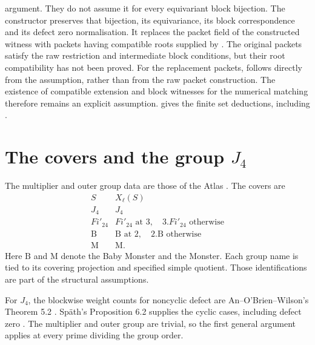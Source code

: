 \begin{implementation}
argument. They do not assume it for every equivariant block bijection.
The constructor  preserves
that bijection, its equivariance, its block correspondence and its
defect zero normalisation. It replaces the packet field of the constructed
witness with packets having compatible roots supplied by
. The original packets satisfy the raw
restriction and intermediate block conditions, but their root compatibility
has not been proved. For the replacement packets, 
follows directly from the assumption, rather than from the raw packet
construction. The existence of compatible extension and block witnesses
for the numerical matching therefore remains an explicit assumption.
 gives the finite set deductions, including .
\end{implementation}

\section{The covers and the group \texorpdfstring{$J_4$}{J4}}

The multiplier and outer group data are those of the Atlas
\cite[Table~1]{Atlas1985}. The covers are
\[
\begin{array}{c|c}
 S&X_\ell(S)\\\hline
 J_4&J_4\\
 Fi'_{24}&Fi'_{24}\text{ at }3,\quad3.Fi'_{24}\text{ otherwise}\\
 \mathrm B&\mathrm B\text{ at }2,\quad2.\mathrm B\text{ otherwise}\\
 \mathrm M&\mathrm M.
\end{array}
\]
Here $\mathrm B$ and $\mathrm M$ denote the Baby Monster and the
Monster. Each group name is tied to its covering projection and
specified simple quotient. Those identifications are part of the
structural assumptions.

For $J_4$, the blockwise weight counts for noncyclic defect are
An--O'Brien--Wilson's Theorem 5.2 \cite{AnOBrienWilsonJ4}. Sp\"ath's
Proposition 6.2 supplies the cyclic cases, including defect zero
\cite{Spath2013}. The multiplier and outer group are trivial, so the first
general argument applies at every prime dividing the group order.

